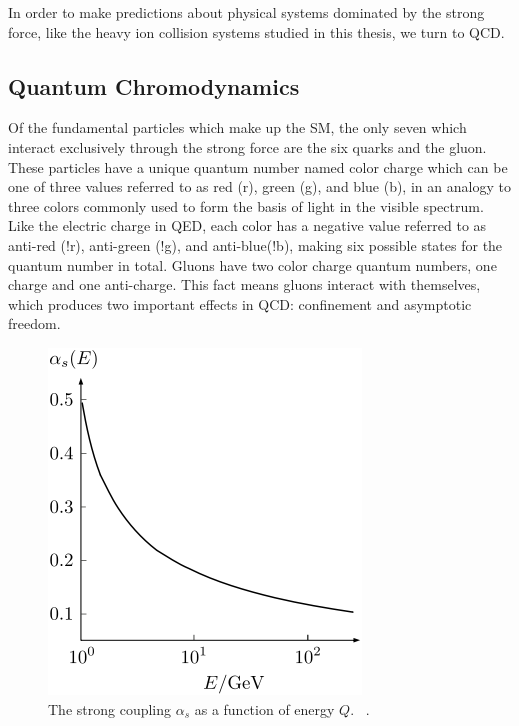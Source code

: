 In order to make predictions about physical systems dominated by the strong force, like the heavy ion collision systems studied in this thesis, we turn to QCD. 

\subsection{Quantum Chromodynamics}
Of the fundamental particles which make up the SM, the only seven which interact exclusively through the strong force are the six quarks and the gluon. 
These particles have a unique quantum number named color charge which can be one of three values referred to as
red (r), green (g), and blue (b), in an analogy to three colors commonly used to form the basis of light in the visible spectrum. Like the electric
charge in QED, each color has a negative value
 referred to as anti-red (!r), anti-green (!g), and anti-blue(!b), making six possible states for the quantum number in total. Gluons have two color charge quantum numbers, one charge and one anti-charge. This fact means gluons interact with themselves, which produces two important effects in QCD: confinement and asymptotic freedom.

\begin{figure}[!ht]
\begin{center}
\includegraphics[width=0.45\linewidth]{figs/coupling_constant.png}
\caption{The strong coupling $\alpha_s$ as a function of energy $Q$. ~\cite{Bethke2009}.}
\end{center}
\label{fig:coupling_plot}
\end{figure}


